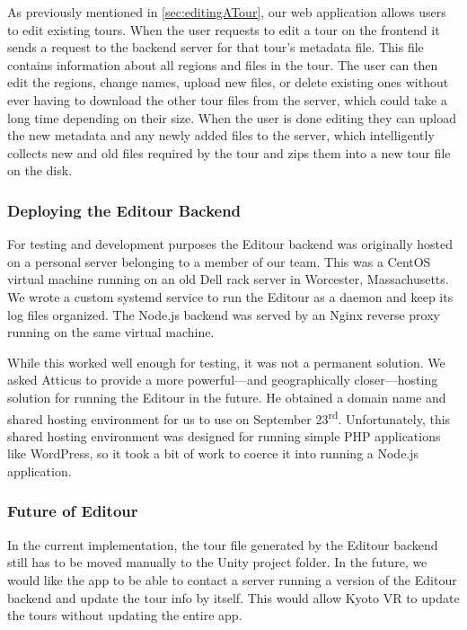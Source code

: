 \documentclass[a4paper, 10pt, american, titlepage]{article}
\begin{document}
As previously mentioned in \ref{sec:editingATour}, our web application allows
users to edit existing tours. When the user requests to edit a tour on the
frontend it sends a request to the backend server for that tour's metadata
file. This file contains information about all regions and files in the tour.
The user can then edit the regions, change names, upload new files, or delete
existing ones without ever having to download the other tour files from the
server, which could take a long time depending on their size. When the user is
done editing they can upload the new metadata and any newly added files to the
server, which intelligently collects new and old files required by the tour and
zips them into a new tour file on the disk.

\subsubsection{Deploying the Editour Backend}
\label{sec:deployingTheEditourBackend}

For testing and development purposes the Editour backend was originally hosted
on a personal server belonging to a member of our team. This was a CentOS
virtual machine running on an old Dell rack server in Worcester, Massachusetts.
We wrote a custom systemd service to run the Editour as a daemon and keep its
log files organized. The Node.js backend was served by an Nginx reverse proxy
running on the same virtual machine.

While this worked well enough for testing, it was not a permanent solution. We
asked Atticus to provide a more powerful---and geographically closer---hosting
solution for running the Editour in the future. He obtained a domain name and
shared hosting environment for us to use on September 23\textsuperscript{rd}.
Unfortunately, this shared hosting environment was designed for running simple
PHP applications like WordPress, so it took a bit of work to coerce it into
running a Node.js application.

\subsubsection{Future of Editour}
\label{sec:futureOfEditour}

In the current implementation, the tour file generated by the Editour backend
still has to be moved manually to the Unity project folder. In the future, we
would like the app to be able to contact a server running a version of the
Editour backend and update the tour info by itself. This would allow Kyoto VR
to update the tours without updating the entire app.
\end{document}
